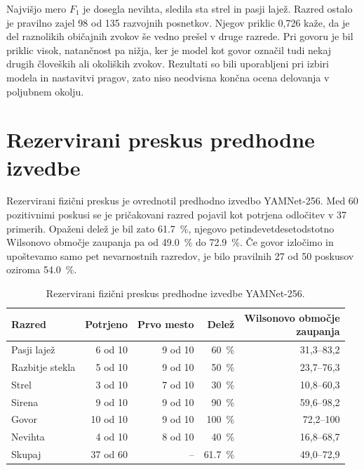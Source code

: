 Najvišjo mero $F_1$ je dosegla nevihta, sledila sta strel in pasji lajež.
Razred ostalo je pravilno zajel 98 od 135 razvojnih posnetkov. Njegov priklic
0,726 kaže, da je del raznolikih običajnih zvokov še vedno prešel v druge
razrede. Pri govoru je bil priklic visok, natančnost pa nižja, ker je model kot
govor označil tudi nekaj drugih človeških ali okoliških zvokov. Rezultati so
bili uporabljeni pri izbiri modela in nastavitvi pragov, zato niso neodvisna
končna ocena delovanja v poljubnem okolju.

\section{Rezervirani preskus predhodne izvedbe}
\label{sec:rezultati-rezervirani}

Rezervirani fizični preskus je ovrednotil predhodno izvedbo YAMNet-256. Med 60
pozitivnimi poskusi se je pričakovani razred pojavil kot potrjena odločitev v
37 primerih. Opaženi delež je bil zato \SI{61.7}{\percent}, njegovo
petindevetdesetodstotno Wilsonovo območje zaupanja pa od \SI{49.0}{\percent}
do \SI{72.9}{\percent}. Če govor izločimo in upoštevamo samo pet nevarnostnih
razredov, je bilo pravilnih 27 od 50 poskusov oziroma \SI{54.0}{\percent}.

\begin{table}[!ht]
  \centering
  \caption{Rezervirani fizični preskus predhodne izvedbe YAMNet-256.}
  \label{tab:rezervirani-rezultati-256}
  \small
  \begin{tabular}{lrrrr}
    \toprule
    Razred & Potrjeno & Prvo mesto & Delež & \shortstack{Wilsonovo območje\\zaupanja} \\
    \midrule
    Pasji lajež       & 6 od 10  & 9 od 10  & \SI{60}{\percent}  & 31,3--83,2 \\
    Razbitje stekla   & 5 od 10  & 9 od 10  & \SI{50}{\percent}  & 23,7--76,3 \\
    Strel             & 3 od 10  & 7 od 10  & \SI{30}{\percent}  & 10,8--60,3 \\
    Sirena            & 9 od 10  & 9 od 10  & \SI{90}{\percent}  & 59,6--98,2 \\
    Govor             & 10 od 10 & 9 od 10  & \SI{100}{\percent} & 72,2--100 \\
    Nevihta           & 4 od 10  & 8 od 10  & \SI{40}{\percent}  & 16,8--68,7 \\
    \midrule
    Skupaj            & 37 od 60 & --        & \SI{61.7}{\percent} & 49,0--72,9 \\
    \bottomrule
  \end{tabular}
\end{table}

